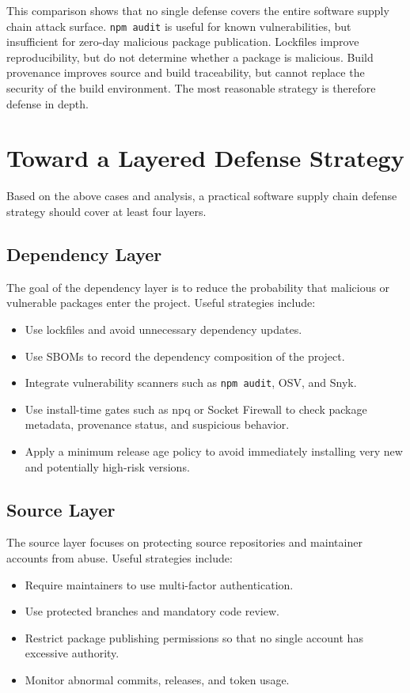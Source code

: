 \documentclass[12pt,a4paper]{article}
\begin{document}
This comparison shows that no single defense covers the entire software supply chain attack surface. \texttt{npm audit} is useful for known vulnerabilities, but insufficient for zero-day malicious package publication. Lockfiles improve reproducibility, but do not determine whether a package is malicious. Build provenance improves source and build traceability, but cannot replace the security of the build environment. The most reasonable strategy is therefore defense in depth.

\section{Toward a Layered Defense Strategy}

Based on the above cases and analysis, a practical software supply chain defense strategy should cover at least four layers.

\subsection{Dependency Layer}

The goal of the dependency layer is to reduce the probability that malicious or vulnerable packages enter the project. Useful strategies include:

\begin{itemize}
  \item Use lockfiles and avoid unnecessary dependency updates.
  \item Use SBOMs to record the dependency composition of the project.
  \item Integrate vulnerability scanners such as \texttt{npm audit}, OSV, and Snyk.
  \item Use install-time gates such as npq or Socket Firewall to check package metadata, provenance status, and suspicious behavior.
  \item Apply a minimum release age policy to avoid immediately installing very new and potentially high-risk versions.
\end{itemize}

\subsection{Source Layer}

The source layer focuses on protecting source repositories and maintainer accounts from abuse. Useful strategies include:

\begin{itemize}
  \item Require maintainers to use multi-factor authentication.
  \item Use protected branches and mandatory code review.
  \item Restrict package publishing permissions so that no single account has excessive authority.
  \item Monitor abnormal commits, releases, and token usage.
\end{itemize}
\end{document}
